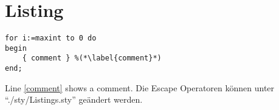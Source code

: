 \documentclass[./\jobname.tex]{subfiles}
\begin{document}
\chapter{Listing}
%
\begin{lstlisting}[caption={example}]
for i:=maxint to 0 do
begin
	{ comment } %(*\label{comment}*)
end;
\end{lstlisting}
Line \ref{comment} shows a comment. Die Escape Operatoren können unter \enquote{./sty/Listings.sty} geändert werden.
%
\end{document}
